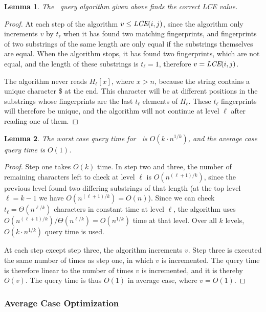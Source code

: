 \documentclass[a4]{article}
\newtheorem{lemma}{Lemma}
\begin{document}
\begin{lemma}
The \fprintk\ query algorithm given above finds the correct LCE value.
\end{lemma}
\begin{proof}
At each step of the algorithm $v \leq \textit{LCE}(i,j)$, since the algorithm only increments $v$ by $t_\ell$ when it has found two matching fingerprints, and fingerprints of two substrings of the same length are only equal if the substrings themselves are equal. When the algorithm stops, it has found two fingerprints, which are not equal, and the length of these substrings is $t_\ell = 1$, therefore $v = \textit{LCE}(i,j)$.

The algorithm never reads $H_\ell[x]$, where $x>n$, because the string contains a unique character \$ at the end. This character will be at different positions in the substrings whose fingerprints are the last $t_\ell$ elements of $H_\ell$. These $t_\ell$ fingerprints will therefore be unique, and the algorithm will not continue at level $\ell$ after reading one of them.
\end{proof}

\begin{lemma}
The worst case query time for \fprintk\ is $O(k\cdot n^{1/k})$, and the average case query time is $O(1)$.
\end{lemma}
\begin{proof}
Step one takes $O(k)$ time. In step two and three, the number of remaining characters left to check at level $\ell$ is $O(n^{(\ell+1)/k})$, since the previous level found two differing substrings of that length (at the top level $\ell=k-1$ we have $O(n^{(\ell+1)/k}) = O(n)$). Since we can check $t_\ell = \Theta(n^{\ell/k})$ characters in constant time at level $\ell$, the algorithm uses $O(n^{(\ell+1)/k})/\Theta(n^{\ell/k}) = O(n^{1/k})$ time at that level. Over all $k$ levels, $O(k\cdot n^{1/k})$ query time is used.

At each step except step three, the algorithm increments $v$. Step three is executed the same number of times as step one, in which $v$ is incremented. The query time is therefore linear to the number of times $v$ is incremented, and it is thereby $O(v)$. The query time is thus $O(1)$ in average case, where $v=O(1)$.
\end{proof}

\subsubsection{Average Case Optimization\label{sec:improved-avg}}
\end{document}
